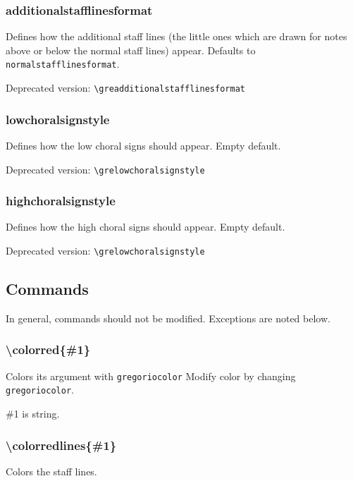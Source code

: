 \subsubsection*{additionalstafflinesformat}
Defines how the additional staff lines (the little ones which are
drawn for notes above or below the normal staff lines) appear.
Defaults to \verb=normalstafflinesformat=.

\smallskip\indent Deprecated version: \verb=\greadditionalstafflinesformat=

\subsubsection*{lowchoralsignstyle}
Defines how the low choral signs should appear.  Empty default.

\smallskip\indent Deprecated version: \verb=\grelowchoralsignstyle=

\subsubsection*{highchoralsignstyle}
Defines how the high choral signs should appear.  Empty default.

\smallskip\indent Deprecated version: \verb=\grelowchoralsignstyle=

\subsection{Commands}

In general, commands should not be modified.  Exceptions are noted below.

\subsubsection*{\textbackslash colorred\{\#1\}}
Colors its argument with \verb=gregoriocolor= Modify color by changing
\verb=gregoriocolor=.

\#1 is string.

\subsubsection*{\textbackslash colorredlines\{\#1\}}
Colors the staff lines.

